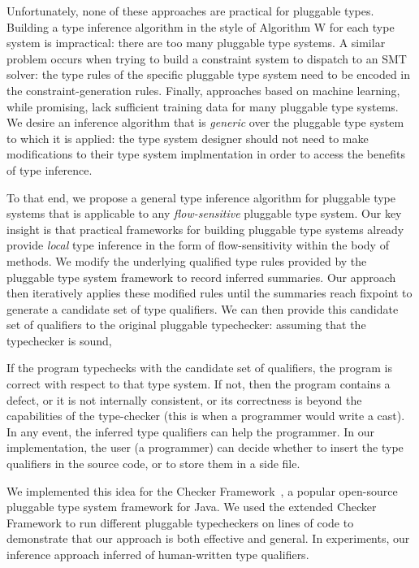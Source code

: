 Unfortunately, none of these approaches are practical for pluggable types.
Building a type inference algorithm in the style of Algorithm W for each
type system is impractical: there are too many pluggable type systems.
A similar problem occurs when trying to build a constraint system to
dispatch to an SMT solver: the type rules of the specific pluggable type system
need to be encoded in the constraint-generation rules. Finally, approaches
based on machine learning, while promising, lack sufficient training data for
many pluggable type systems.
%
We desire an
inference algorithm that is \emph{generic} over the pluggable type system
to which it is applied: the type system designer should not need to
make modifications to their type system implmentation in order to access
the benefits of type inference.

To that end, we propose a general type inference algorithm for pluggable type
systems that is applicable to any \emph{flow-sensitive} pluggable type system.
Our key insight is that
practical frameworks for building pluggable type systems already provide
\emph{local} type inference in the form of flow-sensitivity within the body
of methods.
We modify the underlying qualified type rules provided by the pluggable type
system framework to record inferred summaries.
Our approach then iteratively applies these modified rules until the summaries
reach fixpoint to generate a candidate set of type qualifiers.
We can then provide this candidate set of qualifiers to the original
pluggable typechecker: assuming that the typechecker is sound,

If the program typechecks with the candidate set of qualifiers, the program
is correct with respect to that type system.
If not, then the program contains a defect, or it is not internally
consistent, or its correctness is beyond the capabilities of the
type-checker (this is when a programmer would write a cast).
In any event, the inferred type qualifiers can help the programmer.
In our implementation, the user (a programmer) can decide whether to insert
the type qualifiers in the source code, or to store them in a side file.



We implemented this idea for the Checker Framework~\cite{PapiACPE2008},
a popular open-source pluggable type system
framework for Java.
%
%
We used the extended Checker Framework to run  different pluggable typecheckers
on  lines of code to demonstrate that
our approach is both effective and general.
In experiments, our inference approach inferred  of human-written
type qualifiers.

